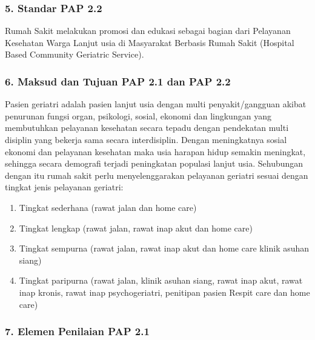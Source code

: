 \documentclass[
]{book}
\providecommand{\tightlist}{%
  \setlength{\itemsep}{0pt}\setlength{\parskip}{0pt}}
\begin{document}
\hypertarget{standar-pap-2.2}{%
\subsubsection*{5. Standar PAP 2.2}\label{standar-pap-2.2}}

Rumah Sakit melakukan promosi dan edukasi sebagai bagian dari Pelayanan Kesehatan Warga Lanjut usia di Masyarakat Berbasis Rumah Sakit (Hospital Based Community Geriatric Service).

\hypertarget{maksud-dan-tujuan-pap-2.1-dan-pap-2.2}{%
\subsubsection*{6. Maksud dan Tujuan PAP 2.1 dan PAP 2.2}\label{maksud-dan-tujuan-pap-2.1-dan-pap-2.2}}

Pasien geriatri adalah pasien lanjut usia dengan multi penyakit/gangguan akibat penurunan fungsi organ, psikologi, sosial, ekonomi dan lingkungan yang membutuhkan pelayanan kesehatan secara tepadu dengan pendekatan multi disiplin yang bekerja sama secara interdisiplin. Dengan meningkatnya sosial ekonomi dan pelayanan kesehatan maka usia harapan hidup semakin meningkat, sehingga secara demografi terjadi peningkatan populasi lanjut usia. Sehubungan dengan itu rumah sakit perlu menyelenggarakan pelayanan geriatri sesuai dengan tingkat jenis pelayanan geriatri:

\begin{enumerate}
\def\labelenumi{\alph{enumi}.}
\tightlist
\item
  Tingkat sederhana (rawat jalan dan home care)
\item
  Tingkat lengkap (rawat jalan, rawat inap akut dan home care)
\item
  Tingkat sempurna (rawat jalan, rawat inap akut dan home care klinik asuhan siang)
\item
  Tingkat paripurna (rawat jalan, klinik asuhan siang, rawat inap akut, rawat inap kronis, rawat inap psychogeriatri, penitipan pasien Respit care dan home care)
\end{enumerate}

\hypertarget{elemen-penilaian-pap-2.1}{%
\subsubsection*{7. Elemen Penilaian PAP 2.1}\label{elemen-penilaian-pap-2.1}}
\end{document}
